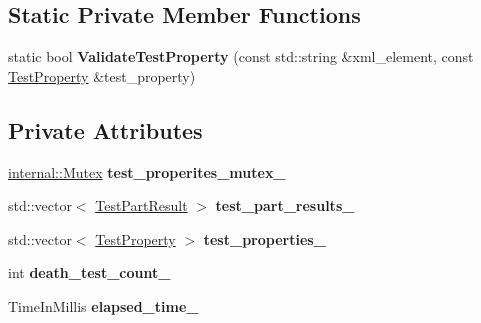\subsection*{Static Private Member Functions}
\begin{DoxyCompactItemize}
\item 
\mbox{\label{classtesting_1_1_test_result_a01f4ffb668d3b2ffa9b1a11e7045001e}} 
static bool {\bfseries Validate\+Test\+Property} (const std\+::string \&xml\+\_\+element, const \hyperlink{classtesting_1_1_test_property}{Test\+Property} \&test\+\_\+property)
\end{DoxyCompactItemize}
\subsection*{Private Attributes}
\begin{DoxyCompactItemize}
\item 
\mbox{\label{classtesting_1_1_test_result_a58d7d97bd16a04b932e2863153c13dff}} 
\hyperlink{classtesting_1_1internal_1_1_mutex}{internal\+::\+Mutex} {\bfseries test\+\_\+properites\+\_\+mutex\+\_\+}
\item 
\mbox{\label{classtesting_1_1_test_result_af17c00fae1435d344b318eb6bbb56cff}} 
std\+::vector$<$ \hyperlink{classtesting_1_1_test_part_result}{Test\+Part\+Result} $>$ {\bfseries test\+\_\+part\+\_\+results\+\_\+}
\item 
\mbox{\label{classtesting_1_1_test_result_a29cde491988faff4ef2d9f9b6c13d9fa}} 
std\+::vector$<$ \hyperlink{classtesting_1_1_test_property}{Test\+Property} $>$ {\bfseries test\+\_\+properties\+\_\+}
\item 
\mbox{\label{classtesting_1_1_test_result_a3810b34e68f5dca9ad1237a5bde7fa21}} 
int {\bfseries death\+\_\+test\+\_\+count\+\_\+}
\item 
\mbox{\label{classtesting_1_1_test_result_a739a8ca54db4be004ba748b11e82b056}} 
Time\+In\+Millis {\bfseries elapsed\+\_\+time\+\_\+}
\end{DoxyCompactItemize}
